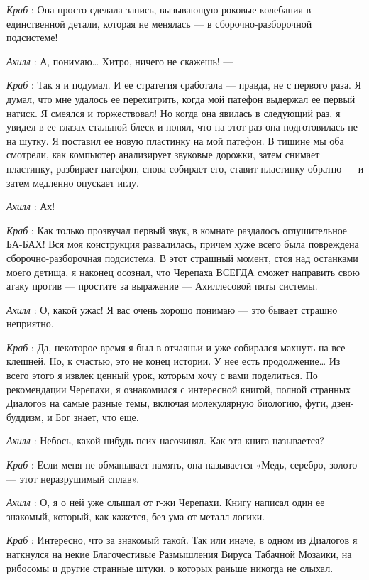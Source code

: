 \emph{Краб} : Она просто сделала запись, вызывающую роковые колебания в единственной детали, которая не менялась --- в сборочно-разборочной подсистеме!

\emph{Ахилл} : А, понимаю\ldots{} Хитро, ничего не скажешь! ---

\emph{Краб} : Так я и подумал. И ее стратегия сработала --- правда, не с первого раза. Я думал, что мне удалось ее перехитрить, когда мой патефон выдержал ее первый натиск. Я смеялся и торжествовал! Но когда она явилась в следующий раз, я увидел в ее глазах стальной блеск и понял, что на этот раз она подготовилась не на шутку. Я поставил ее новую пластинку на мой патефон. В тишине мы оба смотрели, как компьютер анализирует звуковые дорожки, затем снимает пластинку, разбирает патефон, снова собирает его, ставит пластинку обратно --- и затем медленно опускает иглу.

\emph{Ахилл} : Ах!

\emph{Краб} : Как только прозвучал первый звук, в комнате раздалось оглушительное БА-БАХ! Вся моя конструкция развалилась, причем хуже всего была повреждена сборочно-разборочная подсистема. В этот страшный момент, стоя над останками моего детища, я наконец осознал, что Черепаха ВСЕГДА сможет направить свою атаку против --- простите за выражение --- Ахиллесовой пяты системы.

\emph{Ахилл} : О, какой ужас! Я вас очень хорошо понимаю --- это бывает страшно неприятно.

\emph{Краб} : Да, некоторое время я был в отчаяньи и уже собирался махнуть на все клешней. Но, к счастью, это не конец истории. У нее есть продолжение\ldots{} Из всего этого я извлек ценный урок, которым хочу с вами поделиться. По рекомендации Черепахи, я ознакомился с интересной книгой, полной странных Диалогов на самые разные темы, включая молекулярную биологию, фуги, дзен-буддизм, и Бог знает, что еще.

\emph{Ахилл} : Небось, какой-нибудь псих насочинял. Как эта книга называется?

\emph{Краб} : Если меня не обманывает память, она называется «Медь, серебро, золото --- этот неразрушимый сплав».

\emph{Ахилл} : О, я о ней уже слышал от г-жи Черепахи. Книгу написал один ее знакомый, который, как кажется, без ума от металл-логики.

\emph{Краб} : Интересно, что за знакомый такой. Так или иначе, в одном из Диалогов я наткнулся на некие Благочестивые Размышления Вируса Табачной Мозаики, на рибосомы и другие странные штуки, о которых раньше никогда не слыхал.

